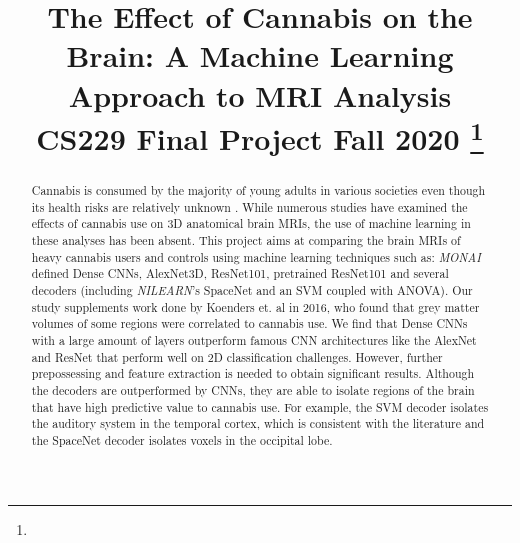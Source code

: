 \documentclass[conference]{IEEEtran}
\begin{document}
\title{The Effect of Cannabis on the Brain: A Machine Learning Approach to MRI Analysis
\\
{\footnotesize \textsuperscript{}CS229 Final Project Fall 2020}
\thanks{}
}

\author{
\and
{}


}

\maketitle

\begin{abstract}

Cannabis is consumed by the majority of young adults in various societies even though its health risks are relatively unknown \cite{b0}. While numerous studies have examined the effects of cannabis use on 3D anatomical brain MRIs, the use of machine learning in these analyses has been absent. This project aims at comparing the brain MRIs of heavy cannabis users and controls using machine learning techniques such as: \textit{MONAI} defined Dense CNNs, AlexNet3D, ResNet101, pretrained ResNet101 and several decoders (including \textit{NILEARN}'s SpaceNet and an SVM coupled with ANOVA). Our study supplements work done by Koenders et. al in 2016, who found that grey matter volumes of some regions were correlated to cannabis use. We find that Dense CNNs with a large amount of layers outperform famous CNN architectures like the AlexNet and ResNet that perform well on 2D classification challenges. However, further prepossessing and feature extraction is needed to obtain significant results. Although the decoders are outperformed by CNNs, they are able to isolate regions of the brain that have high predictive value to cannabis use. For example, the SVM decoder isolates the auditory system in the temporal cortex, which is consistent with the literature \cite{b5}\cite{b6}\cite{b7} and the SpaceNet decoder isolates voxels in the occipital lobe. 
\end{abstract}

\end{document}
